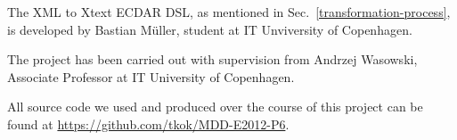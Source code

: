 The XML to Xtext ECDAR DSL, as mentioned in Sec.~\ref{transformation-process}, is developed by Bastian M\"uller, student at IT Unviversity of Copenhagen.

The project has been carried out with supervision from Andrzej Wasowski,
Associate Professor at IT University of Copenhagen.

All source code we used and produced over the course of this project can be found
at \url{https://github.com/tkok/MDD-E2012-P6}.
